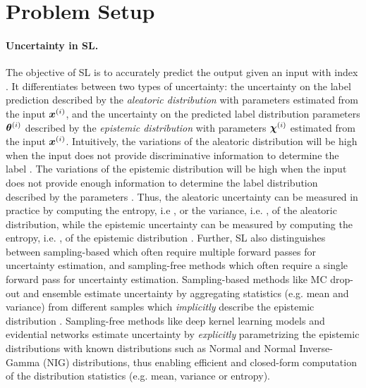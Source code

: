 \vspace{-3mm}
\section{Problem Setup}
\label{sec:setup_011}

\paragraph{Uncertainty in SL.} The objective of SL is to accurately predict the output \smash{$\y\dataix$} given an input \smash{$\x\dataix$} with index \smash{$\idata$}. It differentiates between two types of uncertainty: the uncertainty on the label prediction \smash{$\y\dataix$} described by the \emph{aleatoric distribution} \smash{$\prob(\y\dataix \mid \expparam\dataix)$} with parameters \smash{$\expparam\dataix$} estimated from the input $\x\dataix$, and the uncertainty on the predicted label distribution parameters $\expparam\dataix$ described by the \emph{epistemic distribution} \smash{$\prior(\expparam\dataix \mid \priorparam\dataix)$} with parameters $\priorparam\dataix$ estimated from the input $\x\dataix$. Intuitively, the variations of the aleatoric distribution will be high when the input \smash{$\x\dataix$} does not provide discriminative information to determine the label \smash{$\y\dataix$}. The variations of the epistemic distribution will be high when the input \smash{$\x\dataix$} does not provide enough information to determine the label distribution \smash{$\prior(\expparam\dataix \mid \priorparam\dataix)$} described by the parameters \smash{$\priorparam\dataix$}. Thus, the aleatoric uncertainty can be measured in practice by computing the entropy, i.e , or the variance, i.e. , of the aleatoric distribution, while the epistemic uncertainty can be measured by computing the entropy, i.e. , of the epistemic distribution \citep{PriorNetworks, charpentier2020, natpn}. Further, SL also distinguishes between sampling-based which often require multiple forward passes for uncertainty estimation, and sampling-free methods which often require a single forward pass for uncertainty estimation. Sampling-based methods like MC drop-out \citep{dropout} and ensemble \citep{ensembles, hyper-ensembles, batch-ensembles} estimate uncertainty by aggregating statistics (e.g. mean and variance) from different samples which \emph{implicitly} describe the epistemic distribution \smash{$\prior(\expparam\dataix \mid \priorparam\dataix)$}. Sampling-free methods like deep kernel learning models \citep{simple-baseline-uncertainty, due, duq, uceloss} and evidential networks \citep{charpentier2020, PriorNetworks, natpn, evidential-regression} estimate uncertainty by \emph{explicitly} parametrizing the epistemic distributions \smash{$\prior(\expparam\dataix) \mid \priorparam\dataix)$} with known distributions such as Normal and Normal Inverse-Gamma (NIG) distributions, thus enabling efficient and closed-form computation of the distribution statistics (e.g. mean, variance or entropy).

